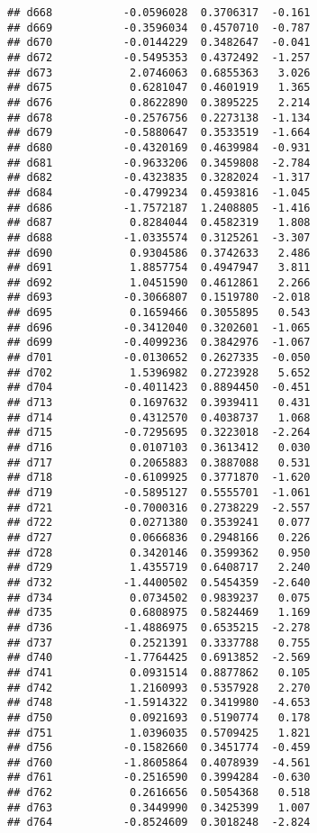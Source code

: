 \documentclass[
]{article}
\begin{document}
\begin{verbatim}
## d668           -0.0596028  0.3706317  -0.161
## d669           -0.3596034  0.4570710  -0.787
## d670           -0.0144229  0.3482647  -0.041
## d672           -0.5495353  0.4372492  -1.257
## d673            2.0746063  0.6855363   3.026
## d675            0.6281047  0.4601919   1.365
## d676            0.8622890  0.3895225   2.214
## d678           -0.2576756  0.2273138  -1.134
## d679           -0.5880647  0.3533519  -1.664
## d680           -0.4320169  0.4639984  -0.931
## d681           -0.9633206  0.3459808  -2.784
## d682           -0.4323835  0.3282024  -1.317
## d684           -0.4799234  0.4593816  -1.045
## d686           -1.7572187  1.2408805  -1.416
## d687            0.8284044  0.4582319   1.808
## d688           -1.0335574  0.3125261  -3.307
## d690            0.9304586  0.3742633   2.486
## d691            1.8857754  0.4947947   3.811
## d692            1.0451590  0.4612861   2.266
## d693           -0.3066807  0.1519780  -2.018
## d695            0.1659466  0.3055895   0.543
## d696           -0.3412040  0.3202601  -1.065
## d699           -0.4099236  0.3842976  -1.067
## d701           -0.0130652  0.2627335  -0.050
## d702            1.5396982  0.2723928   5.652
## d704           -0.4011423  0.8894450  -0.451
## d713            0.1697632  0.3939411   0.431
## d714            0.4312570  0.4038737   1.068
## d715           -0.7295695  0.3223018  -2.264
## d716            0.0107103  0.3613412   0.030
## d717            0.2065883  0.3887088   0.531
## d718           -0.6109925  0.3771870  -1.620
## d719           -0.5895127  0.5555701  -1.061
## d721           -0.7000316  0.2738229  -2.557
## d722            0.0271380  0.3539241   0.077
## d727            0.0666836  0.2948166   0.226
## d728            0.3420146  0.3599362   0.950
## d729            1.4355719  0.6408717   2.240
## d732           -1.4400502  0.5454359  -2.640
## d734            0.0734502  0.9839237   0.075
## d735            0.6808975  0.5824469   1.169
## d736           -1.4886975  0.6535215  -2.278
## d737            0.2521391  0.3337788   0.755
## d740           -1.7764425  0.6913852  -2.569
## d741            0.0931514  0.8877862   0.105
## d742            1.2160993  0.5357928   2.270
## d748           -1.5914322  0.3419980  -4.653
## d750            0.0921693  0.5190774   0.178
## d751            1.0396035  0.5709425   1.821
## d756           -0.1582660  0.3451774  -0.459
## d760           -1.8605864  0.4078939  -4.561
## d761           -0.2516590  0.3994284  -0.630
## d762            0.2616656  0.5054368   0.518
## d763            0.3449990  0.3425399   1.007
## d764           -0.8524609  0.3018248  -2.824

\end{verbatim}
\end{document}
